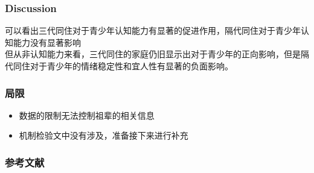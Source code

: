 \documentclass{beamer}
\begin{document}
\begin{frame}
	\frametitle{Discussion}
	可以看出三代同住对于青少年认知能力有显著的促进作用，隔代同住对于青少年认知能力没有显著影响
\\ 但从非认知能力来看，三代同住的家庭仍旧显示出对于青少年的正向影响，但是隔代同住对于青少年的情绪稳定性和宜人性有显著的负面影响。
\end{frame}

\begin{frame}
	\frametitle{局限}
	\begin{itemize}
		\item 数据的限制无法控制祖辈的相关信息
		\item 机制检验文中没有涉及，准备接下来进行补充

	\end{itemize}
\end{frame}


\begin{frame}
    \frametitle{参考文献}
\tiny


\end{frame}

\end{document}

